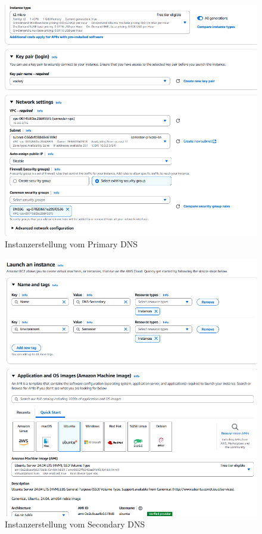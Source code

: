 \documentclass[a4paper,12pt]{article}
\begin{document}
\begin{figure}[H]
	\centering
	\includegraphics[width=\textwidth]{data/Launch_Instance_DNS_Primary2.png}
	\caption{Instanzerstellung vom Primary DNS}
	\label{fig:Instanzecreation vom Primary DNS2}
\end{figure}

\begin{figure}[H]
	\centering
	\includegraphics[width=\textwidth]{data/Launch_Instance_DNS_Secondary.png}
	\caption{Instanzerstellung vom Secondary DNS}
	\label{fig:Instanzecreation vom Secondary DNS}
\end{figure}
\end{document}
